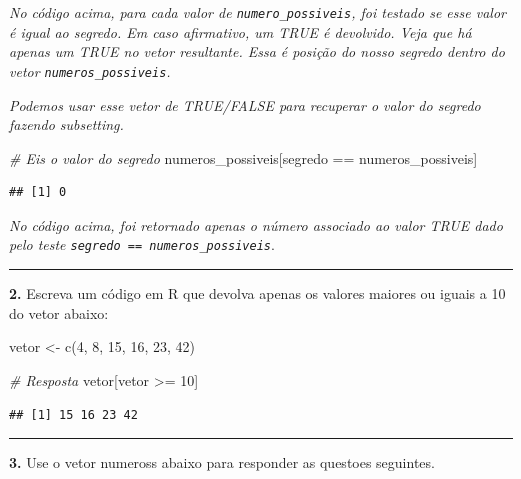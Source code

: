 \documentclass[
]{book}
\newenvironment{Shaded}{\begin{snugshade}}{\end{snugshade}}
\newcommand{\CommentTok}[1]{\textcolor[rgb]{0.56,0.35,0.01}{\textit{#1}}}
\newcommand{\DecValTok}[1]{\textcolor[rgb]{0.00,0.00,0.81}{#1}}
\newcommand{\FunctionTok}[1]{\textcolor[rgb]{0.00,0.00,0.00}{#1}}
\newcommand{\NormalTok}[1]{#1}
\newcommand{\OtherTok}[1]{\textcolor[rgb]{0.56,0.35,0.01}{#1}}
\newcommand{\SpecialCharTok}[1]{\textcolor[rgb]{0.00,0.00,0.00}{#1}}
\begin{document}
\emph{No código acima, para cada valor de \texttt{numero\_possiveis}, foi testado se esse valor é igual ao segredo. Em caso afirmativo, um TRUE é devolvido. Veja que há apenas um TRUE no vetor resultante. Essa é posição do nosso segredo dentro do vetor \texttt{numeros\_possiveis}.}

\emph{Podemos usar esse vetor de TRUE/FALSE para recuperar o valor do segredo fazendo subsetting.}

\begin{Shaded}
\begin{Highlighting}[]
\CommentTok{\# Eis o valor do segredo}
\NormalTok{numeros\_possiveis[segredo }\SpecialCharTok{==}\NormalTok{ numeros\_possiveis]}
\end{Highlighting}
\end{Shaded}

\begin{verbatim}
## [1] 0
\end{verbatim}

\emph{No código acima, foi retornado apenas o número associado ao valor TRUE dado pelo teste \texttt{segredo\ ==\ numeros\_possiveis}}.

\begin{center}\rule{0.5\linewidth}{0.5pt}\end{center}

\textbf{2.} Escreva um código em R que devolva apenas os valores maiores
ou iguais a 10 do vetor abaixo:

\begin{Shaded}
\begin{Highlighting}[]
\NormalTok{vetor }\OtherTok{\textless{}{-}} \FunctionTok{c}\NormalTok{(}\DecValTok{4}\NormalTok{, }\DecValTok{8}\NormalTok{, }\DecValTok{15}\NormalTok{, }\DecValTok{16}\NormalTok{, }\DecValTok{23}\NormalTok{, }\DecValTok{42}\NormalTok{)}

\CommentTok{\# Resposta}
\NormalTok{vetor[vetor }\SpecialCharTok{\textgreater{}=} \DecValTok{10}\NormalTok{]}
\end{Highlighting}
\end{Shaded}

\begin{verbatim}
## [1] 15 16 23 42
\end{verbatim}

\begin{center}\rule{0.5\linewidth}{0.5pt}\end{center}

\textbf{3.} Use o vetor numeross abaixo para responder as questoes seguintes.
\end{document}
